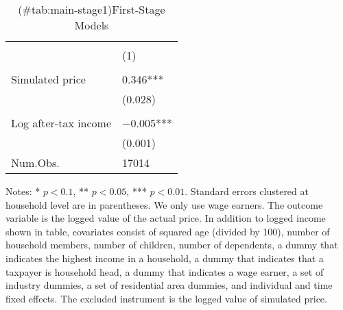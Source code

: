 \begin{table}

\caption{(\#tab:main-stage1)First-Stage Models}
\centering
\fontsize{8}{10}\selectfont
\begin{threeparttable}
\begin{tabular}[t]{l>{\centering\arraybackslash}p{18.75em}}
\toprule
\multicolumn{1}{c}{ } & \multicolumn{1}{c}{Actual price} \\
\cmidrule(l{3pt}r{3pt}){2-2}
  & (1)\\
\midrule
\addlinespace[0.3em]
\multicolumn{2}{l}{\textit{Excluded instruments}}\\
\hspace{1em}Simulated price & \num{0.346}***\\
\hspace{1em} & (\num{0.028})\\
\addlinespace[0.3em]
\multicolumn{2}{l}{\textit{Covariates}}\\
\hspace{1em}Log after-tax income & \num{-0.005}***\\
\hspace{1em} & (\num{0.001})\\
\midrule
Num.Obs. & \num{17014}\\
\bottomrule
\end{tabular}
\begin{tablenotes}
\item Notes: * $p < 0.1$, ** $p < 0.05$, *** $p < 0.01$. Standard errors clustered at household level are in parentheses. We only use wage earners. The outcome variable is the logged value of the actual price. In addition to logged income shown in table, covariates consist of squared age (divided by 100), number of household members, number of children, number of dependents, a dummy that indicates the highest income in a household, a dummy that indicates that a taxpayer is household head, a dummy that indicates a wage earner, a set of industry dummies, a set of residential area dummies, and individual and time fixed effects. The excluded instrument is the logged value of simulated price.
\end{tablenotes}
\end{threeparttable}
\end{table}
